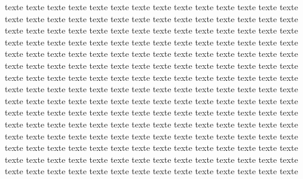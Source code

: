 texte texte texte texte texte texte texte texte texte texte texte texte texte texte texte texte texte texte texte texte texte texte texte texte texte texte texte texte texte texte texte texte texte texte texte texte texte texte texte texte texte texte texte texte texte texte texte texte texte texte texte texte texte texte texte texte texte texte texte texte texte texte texte texte texte texte texte texte texte texte texte texte texte texte texte texte texte texte texte texte texte texte texte texte texte texte texte texte texte texte texte texte texte texte texte texte texte texte texte texte texte texte texte texte texte texte texte texte texte texte texte texte texte texte texte texte texte texte texte texte texte texte texte texte texte texte texte texte texte texte texte texte texte texte texte texte texte texte texte texte texte texte texte texte texte texte texte texte texte texte texte texte texte texte texte texte texte texte texte texte texte texte texte texte texte texte texte texte texte texte texte texte texte texte texte texte texte texte texte texte texte texte texte texte texte texte texte texte texte texte texte texte texte texte texte texte texte texte texte texte texte texte texte texte texte texte texte texte texte texte 